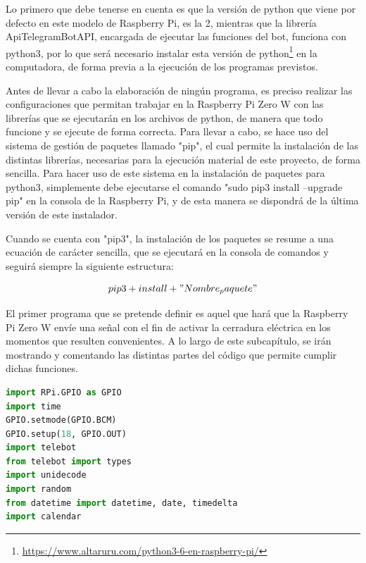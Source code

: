 Lo primero que debe tenerse en cuenta es que la versión de python que viene por defecto en este modelo de Raspberry Pi, es la 2, mientras que la librería ApiTelegramBotAPI, encargada de ejecutar las funciones del bot, funciona con python3, por lo que será necesario instalar esta versión de python\footnote{\url{https://www.altaruru.com/python3-6-en-raspberry-pi/}} en la computadora, de forma previa a la ejecución de los programas previstos.

Antes de llevar a cabo la elaboración de ningún programa, es preciso realizar las configuraciones que permitan trabajar en la Raspberry Pi Zero W con las librerías que se ejecutarán en los archivos de python, de manera que todo funcione y se ejecute de forma correcta. Para llevar a cabo, se hace uso del sistema de gestión de paquetes llamado "pip", el cual permite la instalación de las distintas librerías, necesarias para la ejecución material de este proyecto, de forma sencilla. Para hacer uso de este sistema en la instalación de paquetes para python3, simplemente debe ejecutarse el comando "sudo pip3 install --upgrade pip" en la consola de la Raspberry Pi, y de esta manera se dispondrá de la última versión de este instalador.

Cuando se cuenta con "pip3", la instalación de los paquetes se resume a una ecuación de carácter sencilla, que se ejecutará en la consola de comandos y seguirá siempre la siguiente estructura:

\begin{equation} 
pip3 + install + "Nombre_paquete"
\label{eq:funcionamiento-pip3}
\end{equation}

El primer programa que se pretende definir es aquel que hará que la Raspberry Pi Zero W envíe una señal con el fin de activar la cerradura eléctrica en los momentos que resulten convenientes. A lo largo de este subcapítulo, se irán mostrando y comentando las distintas partes del código que permite cumplir dichas funciones.

\begin{lstlisting}[language=Python,
    caption={Importación de librerias},
    label=src:importacion-librerias
]
import RPi.GPIO as GPIO
import time
GPIO.setmode(GPIO.BCM)
GPIO.setup(18, GPIO.OUT)
import telebot
from telebot import types
import unidecode
import random
from datetime import datetime, date, timedelta
import calendar
\end{lstlisting}

